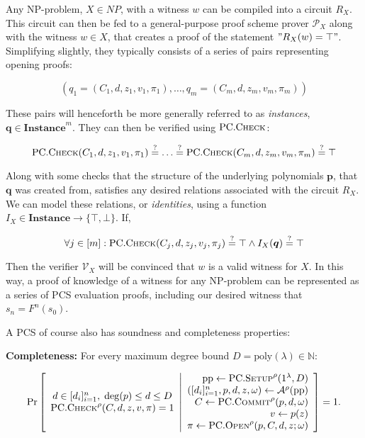 \documentclass[
]{article}
\newcommand*\Nb{\mathbb{N}}
\newcommand*\Ac{\mathcal{A}}
\newcommand*\Pc{\mathcal{P}}
\newcommand*\Vc{\mathcal{V}}
\renewcommand*\l{\lambda}
\renewcommand*\o{\omega}
\newcommand*\meq{\stackrel{?}{=}}
\renewcommand{\vec}[1]{ \boldsymbol{#1} }
\newcommand*{\poly}{\text{poly}}
\newcommand*{\pp}{\mathrm{pp}}
\newcommand*{\Setup}{\mathrm{\text{S{\scriptsize ETUP}}}}
\newcommand*{\Commit}{\mathrm{\text{C{\scriptsize OMMIT}}}}
\newcommand*{\PC}{\text{PC}}
\newcommand*{\PCSetup}{\PC.\Setup}
\newcommand*{\PCCommit}{\PC.\Commit}
\newcommand*{\PCOpen}{\PC.\mathrm{\text{O\scriptsize PEN}}}
\newcommand*{\PCCheck}{\PC.\mathrm{\text{C\scriptsize HECK}}}
\newcommand*\Instance{\mathbf{Instance}}
\begin{document}
Any NP-problem, \(X \in NP\), with a witness \(w\) can be compiled into
a circuit \(R_X\). This circuit can then be fed to a general-purpose
proof scheme prover \(\Pc_X\) along with the witness \(w \in X\), that
creates a proof of the statement \("R_X(w) = \top"\). Simplifying
slightly, they typically consists of a series of pairs representing
opening proofs:

\[(q_1 = (C_1, d, z_1, v_1, \pi_1), \dots, q_m = (C_m, d, z_m, v_m, \pi_m))\]

These pairs will henceforth be more generally referred to as
\emph{instances}, \(\vec{q} \in \Instance^m\). They can then be verified
using \(\PCCheck\):

\[\PCCheck(C_1, d, z_1, v_1, \pi_1) \meq \dots \meq \PCCheck(C_m, d, z_m, v_m, \pi_m) \meq \top\]

Along with some checks that the structure of the underlying polynomials
\(\vec{p}\), that \(\vec{q}\) was created from, satisfies any desired
relations associated with the circuit \(R_X\). We can model these
relations, or \emph{identities}, using a function
\(I_X \in \Instance \to \{ \top, \bot \}\). If,

\[\forall j \in [m] : \PCCheck(C_j, d, z_j, v_j, \pi_j) \meq \top \land I_X(\vec{q}) \meq \top\]

Then the verifier \(\Vc_X\) will be convinced that \(w\) is a valid
witness for \(X\). In this way, a proof of knowledge of a witness for
any NP-problem can be represented as a series of PCS evaluation proofs,
including our desired witness that \(s_n = F^n(s_0)\).

A PCS of course also has soundness and completeness properties:

\textbf{Completeness:} For every maximum degree bound
\(D = \poly(\l) \in \Nb\):

\[
\Pr \left[
  \begin{array}{c}
    d \in [d_i]^n_{i=1}, \; \deg(p) \leq d \leq D \\
    \PCCheck^\rho(C, d, z, v, \pi) = 1
  \end{array}
  \middle|
  \begin{array}{r}
    \pp \leftarrow \PCSetup^\rho(1^\l, D) \\
    ([d_i]^n_{i=1}, p, d, z, \o) \leftarrow \Ac^\rho(\pp) \\
    C \leftarrow \PCCommit^\rho(p, d, \o) \\
    v \leftarrow p(z) \\
    \pi \leftarrow \PCOpen^\rho(p, C, d, z; \o)
  \end{array}
\right] = 1.
\]
\end{document}
